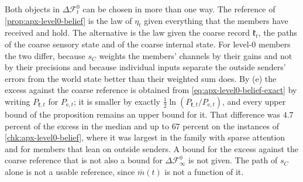 \begin{remark}\label{rem:apx-level0-choices}
Both objects in $\Delta\mathcal F^0_t$ can be chosen in more than one way. The reference of \cref{prop:apx-level0-belief} is the law of $\eta_t$ given everything that the members have received and hold. The alternative is the law given the coarse record $\mathfrak k_t$, the paths of the coarse sensory state and of the coarse internal state. For level-0 members the two differ, because $s_C$ weights the members' channels by their gains and not by their precisions and because individual inputs separate the outside senders' errors from the world state better than their weighted sum does. By (e) the excess against the coarse reference is obtained from \eqref{eq:apx-level0-belief-exact} by writing $P_{\mathfrak k,t}$ for $P_{\mathrm e,t}$; it is smaller by exactly $\frac12\ln(P_{\mathfrak k,t}/P_{\mathrm e,t})$, and every upper bound of the proposition remains an upper bound for it. That difference was $4.7$ percent of the excess in the median and up to $67$ percent on the instances of \cref{chk:apx-level0-belief}, where it was largest in the family with sparse attention and for members that lean on outside senders. A bound for the excess against the coarse reference that is not also a bound for $\Delta\mathcal F^0_\infty$ is not given. The path of $s_C$ alone is not a usable reference, since $\bar m(t)$ is not a function of it.


\end{remark}
